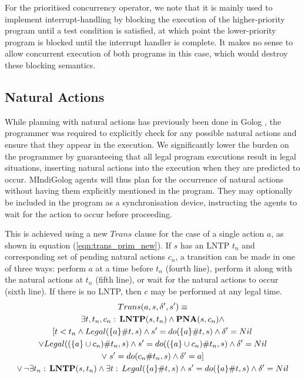 For the prioritised concurrency operator, we note that it is mainly
used to implement interrupt-handling by blocking the execution of
the higher-priority program until a test condition is satisfied, at
which point the lower-priority program is blocked until the interrupt
handler is complete. It makes no sense to allow concurrent execution
of both programs in this case, which would destroy these blocking
semantics.


\subsection{Natural Actions}

While planning with natural actions has previously been done in Golog
\citep{pirri00planning_nat_acts}, the programmer was required to
explicitly check for any possible natural actions and ensure that
they appear in the execution. We significantly lower the burden on
the programmer by guaranteeing that all legal program executions result
in legal situations, inserting natural actions into the execution
when they are predicted to occur. MIndiGolog agents will thus plan
for the occurrence of natural actions without having them explicitly
mentioned in the program. They may optionally be included in the program
as a synchronisation device, instructing the agents to wait for the
action to occur before proceeding.

This is achieved using a new $Trans$ clause for the case of a single
action $a$, as shown in equation (\ref{eqn:trans_prim_new}). If
$s$ has an LNTP $t_{n}$ and corresponding set of pending natural
actions $c_{n}$, a transition can be made in one of three ways: perform
$a$ at a time before $t_{n}$ (fourth line), perform it along with
the natural actions at $t_{n}$ (fifth line), or wait for the natural
actions to occur (sixth line). If there is no LNTP, then $c$ may
be performed at any legal time.\begin{multline}
Trans(a,s,\delta',s')\equiv\\
\exists t,t_{n},c_{n}:\,\mathbf{LNTP}(s,t_{n})\wedge\mathbf{PNA}(s,c_{n})\wedge\\
\left[t<t_{n}\wedge Legal(\{a\}\#t,s)\wedge s'=do(\{a\}\#t,s)\wedge\delta'=Nil\right.\\
\vee Legal((\{a\}\cup c_{n})\#t_{n},s)\wedge s'=do((\{a\}\cup c_{n})\#t_{n},s)\wedge\delta'=Nil\\
\vee\left.s'=do(c_{n}\#t_{n},s)\wedge\delta'=a\right]\\
\vee\,\neg\exists t_{n}:\,\mathbf{LNTP}(s,t_{n})\wedge\exists t:\, Legal(\{a\}\#t,s)\wedge s'=do(\{a\}\#t,s)\wedge\delta'=Nil\label{eqn:trans_prim_new}\end{multline}


